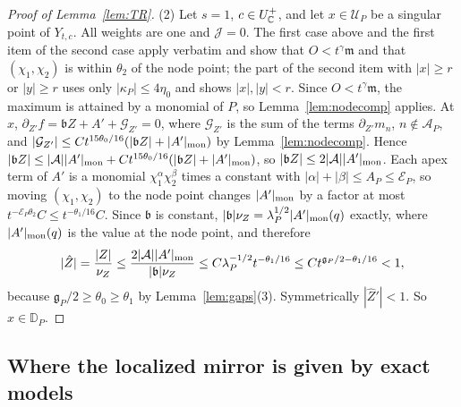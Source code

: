 \begin{proof}[Proof of Lemma~\ref{lem:TR}]
(2) Let $s=1$, $c\in U^+_\mathbb C$, and let $x\in\mathcal U_P$ be a singular point of $Y_{t,c}$. All weights are one and
$\mathcal J=0$. The first case above and the first item of the second case apply verbatim and show that
$O<t^\gamma\mathfrak m$ and that $(\chi_1,\chi_2)$ is within $\theta_2$ of the node point; the part of the second item with
$|x|\ge r$ or $|y|\ge r$ uses only $|\kappa_P|\le4\eta_0$ and shows $|x|,|y|<r$. Since $O<t^\gamma\mathfrak m$, the maximum is
attained by a monomial of $P$, so Lemma~\ref{lem:nodecomp} applies. At $x$, $\partial_{Z'}f=\mathfrak bZ+A'+\mathcal G_{Z'}=0$,
where $\mathcal G_{Z'}$ is the sum of the terms $\partial_{Z'}m_n$, $n\notin\mathcal A_P$, and
$|\mathcal G_{Z'}|\le Ct^{15\theta_0/16}(|\mathfrak bZ|+|A'|_{\rm mon})$ by Lemma~\ref{lem:nodecomp}. Hence
$|\mathfrak bZ|\le|\mathcal A||A'|_{\rm mon}+Ct^{15\theta_0/16}(|\mathfrak bZ|+|A'|_{\rm mon})$, so
$|\mathfrak bZ|\le2|\mathcal A||A'|_{\rm mon}$. Each apex term of $A'$ is a monomial $\chi_1^{\alpha}\chi_2^{\beta}$ times a
constant with $|\alpha|+|\beta|\le A_P\le\mathcal E_P$, so moving $(\chi_1,\chi_2)$ to the node point changes $|A'|_{\rm mon}$
by a factor at most $t^{-\mathcal E_P\theta_2}C\le t^{-\theta_1/16}C$. Since $\mathfrak b$ is constant,
$|\mathfrak b|\nu_Z=\lambda_P^{1/2}|A'|_{\rm mon}(q)$ exactly, where $|A'|_{\rm mon}(q)$ is the value at the node point, and
therefore
\[
|\hat Z|=\frac{|Z|}{\nu_Z}\le\frac{2|\mathcal A||A'|_{\rm mon}}{|\mathfrak b|\nu_Z}\le C\lambda_P^{-1/2}t^{-\theta_1/16}\le
Ct^{\mathfrak g_P/2-\theta_1/16}<1,
\]
because $\mathfrak g_P/2\ge\theta_0\ge\theta_1$ by Lemma~\ref{lem:gaps}(3). Symmetrically $|\hat Z'|<1$. So
$x\in\mathbb D_P$.
\end{proof}

\subsection{Where the localized mirror is given by exact models}\label{app:windows}

